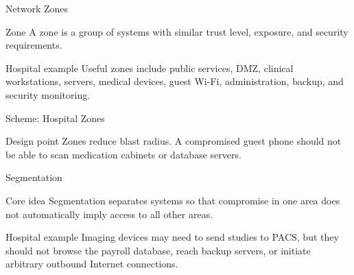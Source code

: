 \documentclass[presentation]{beamer}
\begin{document}
\begin{frame}[c]{Network Zones}
\begin{block}{Zone}
A zone is a group of systems with similar trust level, exposure, and security requirements.
\end{block}

\begin{exampleblock}{Hospital example}
Useful zones include public services, DMZ, clinical workstations, servers, medical devices, guest
Wi-Fi, administration, backup, and security monitoring.
\end{exampleblock}
\end{frame}

\begin{frame}[c]{Scheme: Hospital Zones}
\begin{center}
\end{center}

\begin{block}{Design point}
Zones reduce blast radius. A compromised guest phone should not be able to scan medication cabinets
or database servers.
\end{block}
\end{frame}

\begin{frame}[c]{Segmentation}
\begin{block}{Core idea}
Segmentation separates systems so that compromise in one area does not automatically imply access to
all other areas.
\end{block}

\begin{exampleblock}{Hospital example}
Imaging devices may need to send studies to PACS, but they should not browse the payroll database,
reach backup servers, or initiate arbitrary outbound Internet connections.
\end{exampleblock}
\end{frame}
\end{document}
